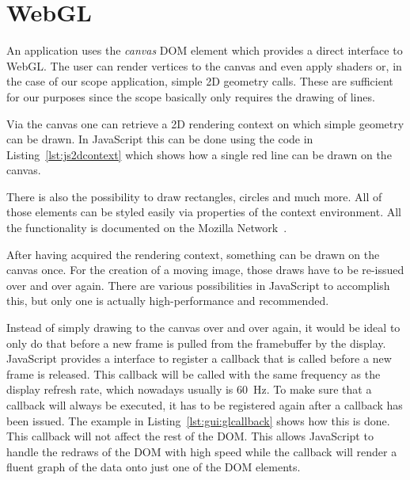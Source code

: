 \section{WebGL} %
\label{sec:app:gui:webgl}

An  application uses  the \emph{canvas}  DOM element  which provides  a direct
interface to WebGL. The user can render  vertices to the canvas and even apply
shaders  or,  in  the  case  of our  scope  application,  simple  2D  geometry
calls. These are  sufficient for our  purposes since the scope  basically only
requires the drawing of lines.

Via  the canvas  one  can retrieve  a  2D rendering  context  on which  simple
geometry can  be drawn.   In JavaScript  this can  be done  using the  code in
Listing~\ref{lst:js2dcontext} which shows  how a single red line  can be drawn
on the canvas.


There  is  also   the  possibility  to  draw  rectangles,   circles  and  much
more. All  of those  elements  can  be styled  easily  via  properties of  the
context  environment. All  the  functionality  is documented  on  the  Mozilla
Network~\cite{moz:2dcontext}.

After having  acquired the rendering  context, something  can be drawn  on the
canvas once.   For the  creation of  a moving  image, those  draws have  to be
re-issued over and  over again. There are various  possibilities in JavaScript
to accomplish this, but only one is actually high-performance and recommended.

Instead of simply drawing to the canvas over and over again, it would be ideal
to only  do that  before a  new frame is  pulled from  the framebuffer  by the
display. JavaScript provides a interface to register a callback that is called
before  a  new frame  is  released. This  callback  will  be called  with  the
same  frequency  as  the  display  refresh rate,  which  nowadays  usually  is
\SI{60}{\hertz}.  To make sure that a callback will always be executed, it has
to  be registered  again  after a  callback has  been  issued. The example  in
Listing~\ref{lst:gui:glcallback} shows  how this is done.   This callback will
not affect the  rest of the DOM. This allows JavaScript  to handle the redraws
of the DOM  with high speed while  the callback will render a  fluent graph of
the data onto just one of the DOM elements.


